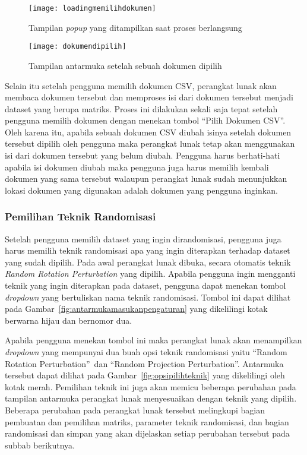 \begin{figure}
	\centering
	\texttt{[image: loadingmemilihdokumen]}
	\caption{Tampilan \textit{popup} yang ditampilkan saat proses berlangsung}
	\label{fig:loadingmemilihdokumen}
\end{figure}

\begin{figure}
	\centering
	\texttt{[image: dokumendipilih]}
	\caption{Tampilan antarmuka setelah sebuah dokumen dipilih}
	\label{fig:dokumendipilih}
\end{figure}

Selain itu setelah pengguna memilih dokumen CSV, perangkat lunak akan membaca dokumen tersebut dan memproses isi dari dokumen tersebut menjadi dataset yang berupa matriks. Proses ini dilakukan sekali saja tepat setelah pengguna memilih dokumen dengan menekan tombol \textquotedblleft Pilih Dokumen CSV\textquotedblright. Oleh karena itu, apabila sebuah dokumen CSV diubah isinya setelah dokumen tersebut dipilih oleh pengguna maka perangkat lunak tetap akan menggunakan isi dari dokumen tersebut yang belum diubah. Pengguna harus berhati-hati apabila isi dokumen diubah maka pengguna juga harus memilih kembali dokumen yang sama tersebut walaupun perangkat lunak sudah menunjukkan lokasi dokumen yang digunakan adalah dokumen yang pengguna inginkan.

\subsubsection{Pemilihan Teknik Randomisasi}
\label{subsubsec:pilihteknik}

Setelah pengguna memilih dataset yang ingin dirandomisasi, pengguna juga harus memilih teknik randomisasi apa yang ingin diterapkan terhadap dataset yang sudah dipilih. Pada awal perangkat lunak dibuka, secara otomatis teknik \textit{Random Rotation Perturbation} yang dipilih. Apabila pengguna ingin mengganti teknik yang ingin diterapkan pada dataset, pengguna dapat menekan tombol \textit{dropdown} yang bertuliskan nama teknik randomisasi. Tombol ini dapat dilihat pada Gambar~\ref{fig:antarmukamasukanpengaturan} yang dikelilingi kotak berwarna hijau dan bernomor dua.

Apabila pengguna menekan tombol ini maka perangkat lunak akan menampilkan \textit{dropdown} yang mempunyai dua buah opsi teknik randomisasi yaitu \textquotedblleft Random Rotation Perturbation\textquotedblright~dan \textquotedblleft Random Projection Perturbation\textquotedblright. Antarmuka tersebut dapat dilihat pada Gambar~\ref{fig:opsipilihteknik} yang dikelilingi oleh kotak merah. Pemilihan teknik ini juga akan memicu beberapa perubahan pada tampilan antarmuka perangkat lunak menyesuaikan dengan teknik yang dipilih. Beberapa perubahan pada perangkat lunak tersebut melingkupi bagian pembuatan dan pemilihan matriks, parameter teknik randomisasi, dan bagian randomisasi dan simpan yang akan dijelaskan setiap perubahan tersebut pada subbab berikutnya.

